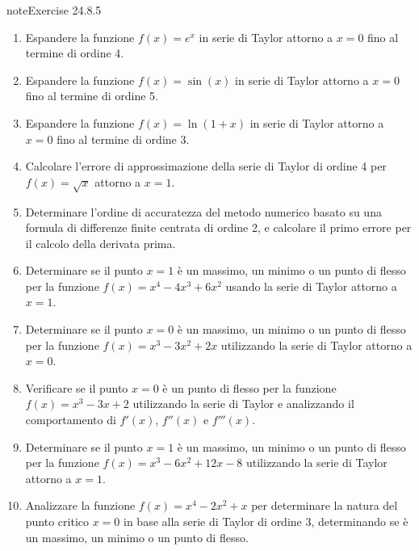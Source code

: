 \documentclass[letterpaper,10pt,italian]{jupyterBook}
\begin{document}
\begin{sphinxadmonition}{note}{Exercise 24.8.5}


\begin{enumerate}
%
\item {} 
\sphinxAtStartPar
Espandere la funzione \(f(x) = e^x\) in serie di Taylor attorno a \(x = 0\) fino al termine di ordine 4.

\item {} 
\sphinxAtStartPar
Espandere la funzione \(f(x) = \sin(x)\) in serie di Taylor attorno a \(x = 0\) fino al termine di ordine 5.

\item {} 
\sphinxAtStartPar
Espandere la funzione \(f(x) = \ln(1 + x)\) in serie di Taylor attorno a \(x = 0\) fino al termine di ordine 3.

\item {} 
\sphinxAtStartPar
Calcolare l’errore di approssimazione della serie di Taylor di ordine 4 per \(f(x) = \sqrt{x}\) attorno a \(x = 1\).

\item {} 
\sphinxAtStartPar
Determinare l’ordine di accuratezza del metodo numerico basato su una formula di differenze finite centrata di ordine 2, e calcolare il primo errore per il calcolo della derivata prima.

\item {} 
\sphinxAtStartPar
Determinare se il punto \(x = 1\) è un massimo, un minimo o un punto di flesso per la funzione \(f(x) = x^4 - 4x^3 + 6x^2\) usando la serie di Taylor attorno a \(x = 1\).

\item {} 
\sphinxAtStartPar
Determinare se il punto \(x = 0\) è un massimo, un minimo o un punto di flesso per la funzione \(f(x) = x^3 - 3x^2 + 2x\) utilizzando la serie di Taylor attorno a \(x = 0\).

\item {} 
\sphinxAtStartPar
Verificare se il punto \(x = 0\) è un punto di flesso per la funzione \(f(x) = x^3 - 3x + 2\) utilizzando la serie di Taylor e analizzando il comportamento di \(f'(x)\), \(f''(x)\) e \(f'''(x)\).

\item {} 
\sphinxAtStartPar
Determinare se il punto \(x = 1\) è un massimo, un minimo o un punto di flesso per la funzione \(f(x) = x^3 - 6x^2 + 12x - 8\) utilizzando la serie di Taylor attorno a \(x = 1\).

\item {} 
\sphinxAtStartPar
Analizzare la funzione \(f(x) = x^4 - 2x^2 + x\) per determinare la natura del punto critico \(x = 0\) in base alla serie di Taylor di ordine 3, determinando se è un massimo, un minimo o un punto di flesso.

\end{enumerate}
\end{sphinxadmonition}
\end{document}
